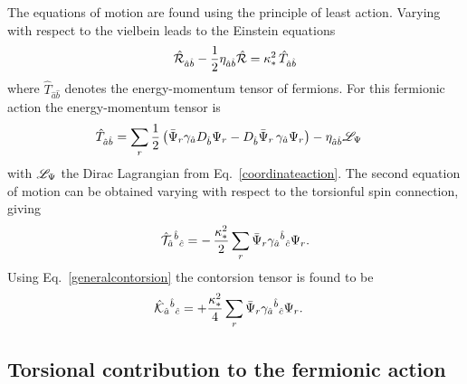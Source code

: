 The equations of motion are found using the principle of least action. Varying with respect to the vielbein leads to the Einstein equations
\begin{equation}
  \label{einsteineom}
  \hat{{\mathcal{R}}}_{\hat{a}\hat{b}} - \frac{1}{2}{\eta}_{\hat{a}\hat{b}}\hat{{\mathcal{R}}} = \kappa_*^2\,\hat{T}_{\hat{a}\hat{b}}
\end{equation}
where $\hat{T}_{\hat{a}\hat{b}}$ denotes the energy-momentum tensor of fermions. For this fermionic action the energy-momentum tensor is
\begin{align}
  \hat{T}_{\hat{a}\hat{b}} &= \sum_{r}\frac{1}{2}\left(\bar{\Psi}_r\gamma_{\hat{a}}D_{\hat{b}}\Psi_r - D_{\hat{b}}\bar{\Psi}_r\,\gamma_{\hat{a}}\Psi_r\right) - {\eta}_{\hat{a}\hat{b}}\mathscr{L}_{\Psi}
\end{align}
with $\mathscr{L}_\Psi$ the Dirac Lagrangian from Eq.~\eqref{coordinateaction}. The second equation of motion can be obtained varying with respect to the torsionful spin connection, giving
\begin{align}
  \label{torsion}
  \hat{\mathcal{T}}_{\hat{a}}{}^{\hat{b}}{}_{\hat{c}} = -\, \frac{\kappa_*^2}{2}\sum_{r}\bar{\Psi}_r\gamma_{\hat{a}}{}^{\hat{b}}{}_{\hat{c}}\Psi_r.
\end{align}
Using Eq.~\eqref{generalcontorsion} the contorsion tensor is  found to be
\begin{align}
  \label{contorsionfound}
  \hat{\mathcal{K}}_{\hat{a}}{}^{\hat{b}}{}_{\hat{c}} &= + \frac{\kappa_*^2}{4}\sum_{r}\bar{\Psi}_r\gamma_{\hat{a}}{}^{\hat{b}}{}_{\hat{c}}\Psi_r.
\end{align}

\subsection{Torsional contribution to the fermionic action}

